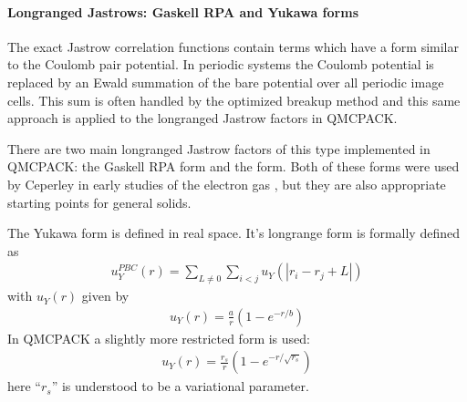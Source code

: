 \documentclass[letterpaper,10pt,english]{sphinxmanual}
\begin{document}
\paragraph{Long\sphinxhyphen{}ranged Jastrows: Gaskell RPA and Yukawa forms}
\label{\detokenize{intro_wavefunction:long-ranged-jastrows-gaskell-rpa-and-yukawa-forms}}\label{\detokenize{intro_wavefunction:twobodyjastrowlr}}

The exact Jastrow correlation functions contain terms which have a
form similar to the Coulomb pair potential.  In periodic systems
the Coulomb potential is replaced by an Ewald summation of the
bare potential over all periodic image cells.  This sum is often
handled by the optimized breakup method  and this
same approach is applied to the long\sphinxhyphen{}ranged Jastrow factors in QMCPACK.

There are two main long\sphinxhyphen{}ranged Jastrow factors of this type
implemented in QMCPACK: the Gaskell RPA 
form and the  form.  Both of these forms
were used by Ceperley in early studies of the electron gas ,
but they are also appropriate starting points for general solids.

The Yukawa form is defined in real space.  It’s long\sphinxhyphen{}range form is
formally defined as
\begin{equation}\label{equation:intro_wavefunction:eq18}
\begin{split}u_Y^{PBC}(r) = \sum_{L\ne 0}\sum_{i<j}u_Y(\left|{r_i-r_j+L}\right|)\end{split}
\end{equation}
with \(u_Y(r)\) given by
\begin{equation}\label{equation:intro_wavefunction:eq19}
\begin{split}u_Y(r) = \frac{a}{r}\left(1-e^{-r/b}\right)\end{split}
\end{equation}
In QMCPACK a slightly more restricted form is used:
\begin{equation}\label{equation:intro_wavefunction:eq20}
\begin{split}u_Y(r) = \frac{r_s}{r}\left(1-e^{-r/\sqrt{r_s}}\right)\end{split}
\end{equation}
here “\(r_s\)” is understood to be a variational parameter.
\end{document}
